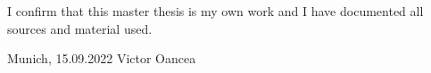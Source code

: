 \thispagestyle{empty}
\vspace*{0.8\textheight}
\noindent
I confirm that this master thesis is my own work and I have documented all sources and material used.

\vspace{15mm}
\noindent
Munich, 15.09.2022 \hspace{50mm} Victor Oancea{}


\cleardoublepage{}
